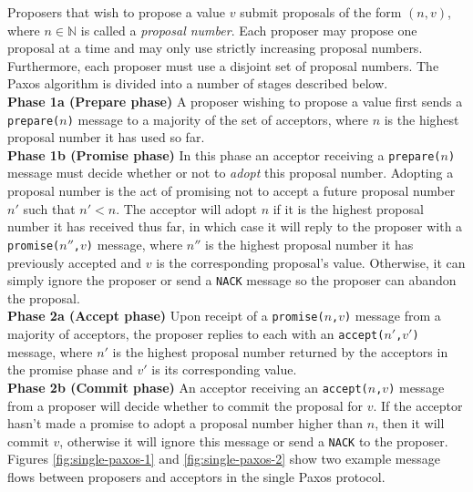Proposers that wish to propose a value $v$ submit proposals of the form $\left(n,v\right)$, where $n \in \mathbb{N}$ is called a \emph{proposal number}. Each proposer may propose one proposal at a time and may only use strictly increasing proposal numbers. Furthermore, each proposer must use a disjoint set of proposal numbers. The Paxos algorithm is divided into a number of stages described below. \\

\textbf{Phase 1a (Prepare phase)} A proposer wishing to propose a value first sends a \texttt{prepare($n$)} message to a majority of the set of acceptors, where $n$ is the highest proposal number it has used so far. \\

\textbf{Phase 1b (Promise phase)} In this phase an acceptor receiving a \texttt{prepare($n$)} message must decide whether or not to \emph{adopt} this proposal number. Adopting a proposal number is the act of promising not to accept a future proposal number $n'$ such that $n' < n$. The acceptor will adopt $n$ if it is the highest proposal number it has received thus far, in which case it will reply to the proposer with a \texttt{promise($n''$,$v$)} message, where $n''$ is the highest proposal number it has previously accepted and $v$ is the corresponding proposal's value. Otherwise, it can simply ignore the proposer or send a \texttt{NACK} message so the proposer can abandon the proposal. \\

\textbf{Phase 2a (Accept phase)} Upon receipt of a \texttt{promise($n$,$v$)} message from a majority of acceptors, the proposer replies to each with an \texttt{accept($n'$,$v'$)} message, where $n'$ is the highest proposal number returned by the acceptors in the promise phase and $v'$ is its corresponding value. \\

\textbf{Phase 2b (Commit phase)} An acceptor receiving an \texttt{accept($n$,$v$)} message from a proposer will decide whether to commit the proposal for $v$. If the acceptor hasn't made a promise to adopt a proposal number higher than $n$, then it will commit $v$, otherwise it will ignore this message or send a \texttt{NACK} to the proposer. \\

Figures \ref{fig:single-paxos-1} and \ref{fig:single-paxos-2} show two example message flows between proposers and acceptors in the single Paxos protocol. \\

